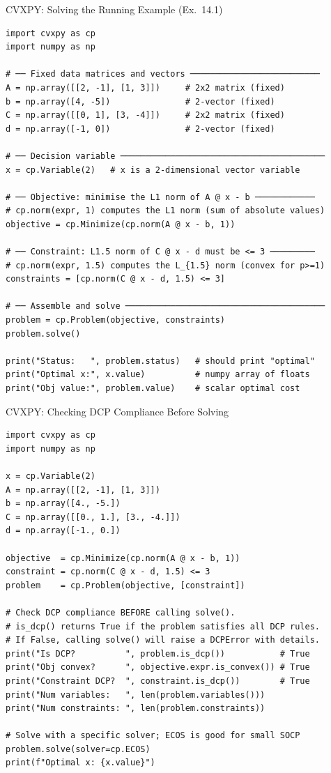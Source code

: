 \documentclass[aspectratio=169,10pt]{beamer}
\begin{document}
\begin{frame}[fragile]{CVXPY: Solving the Running Example (Ex.\ 14.1)}
\begin{lstlisting}[caption={Solving the running example with CVXPY: L1 minimisation with L1.5 constraint}]
import cvxpy as cp
import numpy as np

# ── Fixed data matrices and vectors ──────────────────────────
A = np.array([[2, -1], [1, 3]])     # 2x2 matrix (fixed)
b = np.array([4, -5])               # 2-vector (fixed)
C = np.array([[0, 1], [3, -4]])     # 2x2 matrix (fixed)
d = np.array([-1, 0])               # 2-vector (fixed)

# ── Decision variable ─────────────────────────────────────────
x = cp.Variable(2)   # x is a 2-dimensional vector variable

# ── Objective: minimise the L1 norm of A @ x - b ────────────
# cp.norm(expr, 1) computes the L1 norm (sum of absolute values)
objective = cp.Minimize(cp.norm(A @ x - b, 1))

# ── Constraint: L1.5 norm of C @ x - d must be <= 3 ─────────
# cp.norm(expr, 1.5) computes the L_{1.5} norm (convex for p>=1)
constraints = [cp.norm(C @ x - d, 1.5) <= 3]

# ── Assemble and solve ────────────────────────────────────────
problem = cp.Problem(objective, constraints)
problem.solve()

print("Status:   ", problem.status)   # should print "optimal"
print("Optimal x:", x.value)          # numpy array of floats
print("Obj value:", problem.value)    # scalar optimal cost
\end{lstlisting}
\end{frame}

\begin{frame}[fragile]{CVXPY: Checking DCP Compliance Before Solving}
\begin{lstlisting}[caption={Querying DCP properties of a problem before calling solve()}]
import cvxpy as cp
import numpy as np

x = cp.Variable(2)
A = np.array([[2, -1], [1, 3]])
b = np.array([4., -5.])
C = np.array([[0., 1.], [3., -4.]])
d = np.array([-1., 0.])

objective  = cp.Minimize(cp.norm(A @ x - b, 1))
constraint = cp.norm(C @ x - d, 1.5) <= 3
problem    = cp.Problem(objective, [constraint])

# Check DCP compliance BEFORE calling solve().
# is_dcp() returns True if the problem satisfies all DCP rules.
# If False, calling solve() will raise a DCPError with details.
print("Is DCP?          ", problem.is_dcp())           # True
print("Obj convex?      ", objective.expr.is_convex()) # True
print("Constraint DCP?  ", constraint.is_dcp())        # True
print("Num variables:   ", len(problem.variables()))
print("Num constraints: ", len(problem.constraints))

# Solve with a specific solver; ECOS is good for small SOCP
problem.solve(solver=cp.ECOS)
print(f"Optimal x: {x.value}")
\end{lstlisting}
\end{frame}
\end{document}
